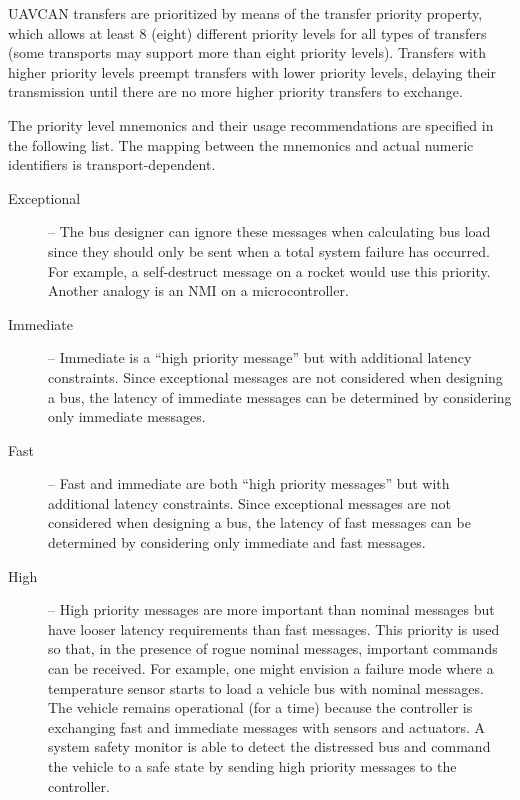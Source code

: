 UAVCAN transfers are prioritized by means of the transfer priority property,
which allows at least 8 (eight) different priority levels for all types of transfers
(some transports may support more than eight priority levels).
Transfers with higher priority levels preempt transfers with lower priority levels,
delaying their transmission until there are no more higher priority transfers to exchange.

\begin{remark}[breakable]
    The priority level mnemonics and their usage recommendations are specified in the following list.
    The mapping between the mnemonics and actual numeric identifiers is transport-dependent.

    \begin{description}
        \item[Exceptional] -- The bus designer can ignore these messages when calculating bus load since they
        should only be sent when a total system failure has occurred.
        For example, a self-destruct message on a rocket would use this priority.
        Another analogy is an NMI on a microcontroller.

        \item[Immediate] -- Immediate is a ``high priority message'' but with additional latency constraints.
        Since exceptional messages are not considered when designing a bus, the latency of immediate messages
        can be determined by considering only immediate messages.

        \item[Fast] -- Fast and immediate are both ``high priority messages'' but with additional latency constraints.
        Since exceptional messages are not considered when designing a bus,
        the latency of fast messages can be determined by considering only immediate and fast messages.

        \item[High] -- High priority messages are more important than nominal messages but have looser
        latency requirements than fast messages. This priority is used so that,
        in the presence of rogue nominal messages, important commands can be received.
        For example, one might envision a failure mode where a temperature sensor starts to
        load a vehicle bus with nominal messages.
        The vehicle remains operational (for a time) because the controller is exchanging fast and
        immediate messages with sensors and actuators.
        A system safety monitor is able to detect the distressed bus and command the vehicle to a
        safe state by sending high priority messages to the controller.


\end{description}
\end{remark}

